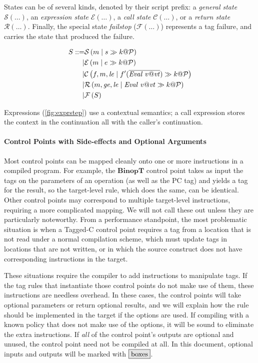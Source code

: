 \documentclass[acmsmall,review,anonymous]{acmart}\settopmatter{printfolios=true,printccs=false,printacmref=false}
\begin{document}
States can be of several kinds, denoted by their script prefix: a {\em general state} \(\mathcal{S}(\dots)\),
an {\em expression state} \(\mathcal{E}(\dots)\), a {\em call state} \(\mathcal{C}(\dots)\), or a
{\em return state} \(\mathcal{R}(\dots)\). Finally, the special state {\em failstop} (\(\mathcal{F}(\dots)\))
represents a tag failure, and carries the state that produced the failure.

\[\begin{aligned}
S ::= & \mathcal{S}\left(m \mid s \gg k @ \mathcal{P}\right) \\
| & \mathcal{E}\left(m \mid e \gg k @ \mathcal{P}\right) \\
| & \mathcal{C}\left(f,m,\mathit{le} \mid f'(\overline{\mathit{Eval} ~ v@\mathit{vt}}) \gg k @ \mathcal{P}\right) \\
| & \mathcal{R}\left(m,\mathit{ge},\mathit{le} \mid \mathit{Eval} ~ v@\mathit{vt} \gg k @ \mathcal{P}\right) \\
| & \mathcal{F}\left(S\right) \\
\end{aligned}\]

Expressions (\cref{fig:exprstep}) use a contextual semantics; a call expression stores the
context in the continuation all with the caller's continuation.

\paragraph*{Control Points with Side-effects and Optional Arguments}

Most control points can be mapped cleanly onto one or more instructions in a compiled
program. For example, the \(\mathbf{BinopT}\) control point takes as input the tags on the parameters
of an operation (as well as the PC tag) and yields a tag for the result, so the target-level
rule, which does the same, can be identical. Other control points may correspond to multiple
target-level instructions, requiring a more complicated mapping. We will not call these out
unless they are particularly noteworthy. From a performance standpoint, the most problematic
situation is when a Tagged-C control point requires a tag from a location that is not read under
a normal compilation scheme, which must update tags in locations that are not written, or in which
the source construct does not have corresponding instructions in the target.

These situations require the compiler to add instructions to manipulate tags.
If the tag rules that instantiate those control points do not make use of them, these instructions
are needless overhead. In these cases, the control points will take optional parameters or return
optional results, and we will explain how the rule should be implemented in the target if the
options are used. If compiling with a known policy that does not make use of the options, it will
be sound to eliminate the extra instructions. If {\it all} of the control point's outputs are
optional and unused, the control point need not be compiled at all. In this document, optional inputs
and outputs will be marked with \(\optional{boxes}\).
\end{document}
